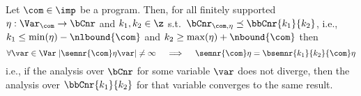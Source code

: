 

\begin{theorem}
  Let \(\com\in\imp\) be a program. Then, for all finitely supported
  \(\eta : \Var_{\com} \to \bCnr\) and \(k_1, k_2 \in \z\) s.t.\
  \(\bCnr_{\com,\eta} \preceq \bbCnr{k_1}{k_2}\), i.e.,
  \(k_1 \leq \min(\eta) - \nlbound{\com}\) and
  \(k_2 \geq \max(\eta) + \nbound{\com}\) then
  \begin{equation*}
    \forall \var\in\Var \; |\semnr{\com}\eta\var| \neq \infty \quad \implies \quad \semnr{\com}\eta = \bsemnr{k_1}{k_2}{\com}\eta
  \end{equation*}
  i.e., if the analysis over \(\bCnr\) for some variable \(\var\) does
  not diverge, then the analysis over \(\bbCnr{k_1}{k_2}\) for that
  variable converges to the same result.
\end{theorem}

